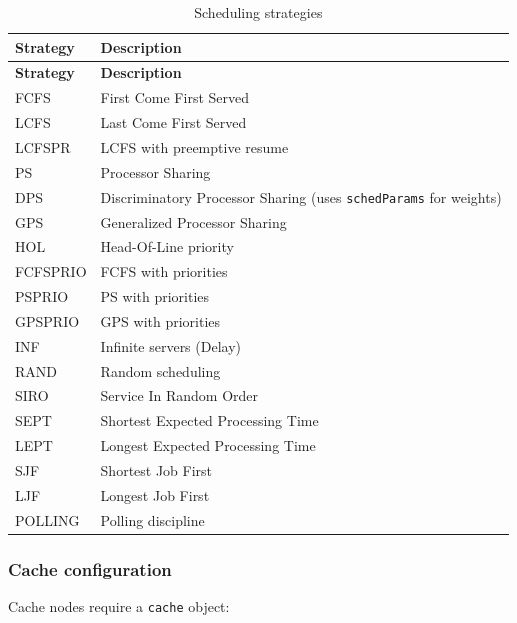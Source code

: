 \begin{footnotesize}
\begin{longtable}{|T{2.2cm}|D{10.7cm}|}
\caption{Scheduling strategies}\label{tab:json-sched}
\\\hline
\textbf{Strategy} & \textbf{Description} \\\hline
\endfirsthead
\hline \textbf{Strategy} & \textbf{Description} \\\hline
\endhead
\hline
\endfoot
FCFS    & First Come First Served \\\hline
LCFS    & Last Come First Served \\\hline
LCFSPR  & LCFS with preemptive resume \\\hline
PS      & Processor Sharing \\\hline
DPS     & Discriminatory Processor Sharing (uses \texttt{schedParams} for weights) \\\hline
GPS     & Generalized Processor Sharing \\\hline
HOL     & Head-Of-Line priority \\\hline
FCFSPRIO & FCFS with priorities \\\hline
PSPRIO  & PS with priorities \\\hline
GPSPRIO & GPS with priorities \\\hline
INF     & Infinite servers (Delay) \\\hline
RAND    & Random scheduling \\\hline
SIRO    & Service In Random Order \\\hline
SEPT    & Shortest Expected Processing Time \\\hline
LEPT    & Longest Expected Processing Time \\\hline
SJF     & Shortest Job First \\\hline
LJF     & Longest Job First \\\hline
POLLING & Polling discipline \\\hline
\end{longtable}
\end{footnotesize}

\subsubsection{Cache configuration}
\label{json:cache}

Cache nodes require a \texttt{cache} object:

